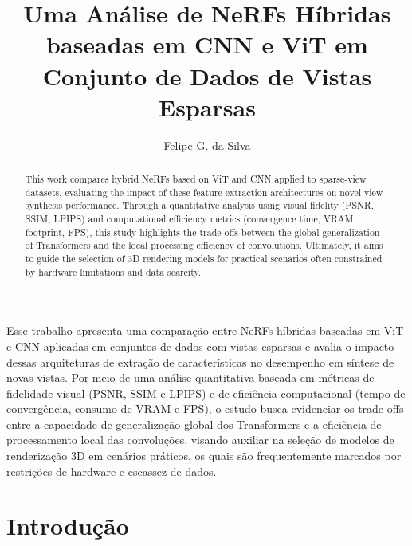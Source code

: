 \documentclass[12pt]{article}
\title{Uma Análise de NeRFs Híbridas baseadas em CNN e ViT em Conjunto de Dados de Vistas Esparsas}
\author{Felipe G. da Silva\inst{1}}
\begin{document}
 

\maketitle

\begin{abstract}
 This work compares hybrid NeRFs based on ViT and CNN applied to sparse-view datasets, evaluating the impact of these feature extraction architectures on novel view synthesis performance. Through a quantitative analysis using visual fidelity (PSNR, SSIM, LPIPS) and computational efficiency metrics (convergence time, VRAM footprint, FPS), this study highlights the trade-offs between the global generalization of Transformers and the local processing efficiency of convolutions. Ultimately, it aims to guide the selection of 3D rendering models for practical scenarios often constrained by hardware limitations and data scarcity.
\end{abstract}

\begin{resumo}
  Esse trabalho apresenta uma comparação entre NeRFs híbridas baseadas em ViT e CNN aplicadas em conjuntos de dados com vistas esparsas e avalia o impacto dessas arquiteturas de extração de características no desempenho em síntese de novas vistas. Por meio de uma análise quantitativa baseada em métricas de fidelidade visual (PSNR, SSIM e LPIPS) e de eficiência computacional (tempo de convergência, consumo de VRAM e FPS), o estudo busca evidenciar os trade-offs entre a capacidade de generalização global dos Transformers e a eficiência de processamento local das convoluções,  visando auxiliar na seleção de modelos de renderização 3D em cenários práticos, os quais são frequentemente marcados por restrições de hardware e escassez de dados.
\end{resumo}

\section{Introdução}
\end{document}
